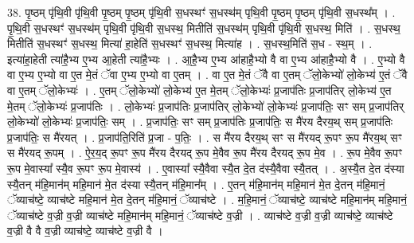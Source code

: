 \documentclass[17pt]{extarticle}
\begin{document}
38. पृ॒ष्ठम् पृ॑थि॒वी पृ॑थि॒वी पृ॒ष्ठम् पृ॒ष्ठम् पृ॑थि॒वी स॒धस्थꣳ॑ स॒धस्थ॑म् पृथि॒वी पृ॒ष्ठम् पृ॒ष्ठम् पृ॑थि॒वी स॒धस्थ᳚म् । . पृ॒थि॒वी स॒धस्थꣳ॑ स॒धस्थ॑म् पृथि॒वी पृ॑थि॒वी स॒धस्थ॒ मितीति॑ स॒धस्थ॑म् पृथि॒वी पृ॑थि॒वी स॒धस्थ॒ मिति॑ । . स॒धस्थ॒ मितीति॑ स॒धस्थꣳ॑ स॒धस्थ॒ मित्या॑ हा॒हेति॑ स॒धस्थꣳ॑ स॒धस्थ॒ मित्या॑ह । . स॒धस्थ॒मिति॑ स॒ध - स्थ॒म् । . इत्या॑हा॒हेती त्या॑है॒भ्य ए॒भ्य आ॒हेती त्या॑है॒भ्यः । . आ॒है॒भ्य ए॒भ्य आ॑हाहै॒भ्यो वै वा ए॒भ्य आ॑हाहै॒भ्यो वै । . ए॒भ्यो वै वा ए॒भ्य ए॒भ्यो वा ए॒त मे॒तं ॅवा ए॒भ्य ए॒भ्यो वा ए॒तम् । . वा ए॒त मे॒तं ॅवै वा ए॒तम् ॅलो॒केभ्यो॑ लो॒केभ्य॑ ए॒तं ॅवै वा ए॒तम् ॅलो॒केभ्यः॑ । . ए॒तम् ॅलो॒केभ्यो॑ लो॒केभ्य॑ ए॒त मे॒तम् ॅलो॒केभ्यः॑ प्र॒जाप॑तिः प्र॒जाप॑तिर् लो॒केभ्य॑ ए॒त मे॒तम् ॅलो॒केभ्यः॑ प्र॒जाप॑तिः । . लो॒केभ्यः॑ प्र॒जाप॑तिः प्र॒जाप॑तिर् लो॒केभ्यो॑ लो॒केभ्यः॑ प्र॒जाप॑तिः॒ सꣳ सम् प्र॒जाप॑तिर् लो॒केभ्यो॑ लो॒केभ्यः॑ प्र॒जाप॑तिः॒ सम् । . प्र॒जाप॑तिः॒ सꣳ सम् प्र॒जाप॑तिः प्र॒जाप॑तिः॒ स मै॑रय दैरय॒थ् सम् प्र॒जाप॑तिः प्र॒जाप॑तिः॒ स मै॑रयत् । . प्र॒जाप॑ति॒रिति॑ प्र॒जा - प॒तिः॒ । . स मै॑रय दैरय॒थ् सꣳ स मै॑रयद् रू॒पꣳ रू॒प मै॑रय॒थ् सꣳ स मै॑रयद् रू॒पम् । . ऐ॒र॒य॒द् रू॒पꣳ रू॒प मै॑रय दैरयद् रू॒प मे॒वैव रू॒प मै॑रय दैरयद् रू॒प मे॒व । . रू॒प मे॒वैव रू॒पꣳ रू॒प मे॒वास्या᳚ स्यै॒व रू॒पꣳ रू॒प मे॒वास्य॑ । . ए॒वास्या᳚ स्यै॒वैवा स्यै॒त दे॒त द॑स्यै॒वैवा स्यै॒तत् । . अ॒स्यै॒त दे॒त द॑स्या स्यै॒तन् म॑हि॒मान॑म् महि॒मान॑ मे॒त द॑स्या स्यै॒तन् म॑हि॒मान᳚म् । . ए॒तन् म॑हि॒मान॑म् महि॒मान॑ मे॒त दे॒तन् म॑हि॒मानं॒ ॅव्याच॑ष्टे॒ व्याच॑ष्टे महि॒मान॑ मे॒त दे॒तन् म॑हि॒मानं॒ ॅव्याच॑ष्टे । . म॒हि॒मानं॒ ॅव्याच॑ष्टे॒ व्याच॑ष्टे महि॒मान॑म् महि॒मानं॒ ॅव्याच॑ष्टे व॒ज्री व॒ज्री व्याच॑ष्टे महि॒मान॑म् महि॒मानं॒ ॅव्याच॑ष्टे व॒ज्री । . व्याच॑ष्टे व॒ज्री व॒ज्री व्याच॑ष्टे॒ व्याच॑ष्टे व॒ज्री वै वै व॒ज्री व्याच॑ष्टे॒ व्याच॑ष्टे व॒ज्री वै । \newline
\end{document}
